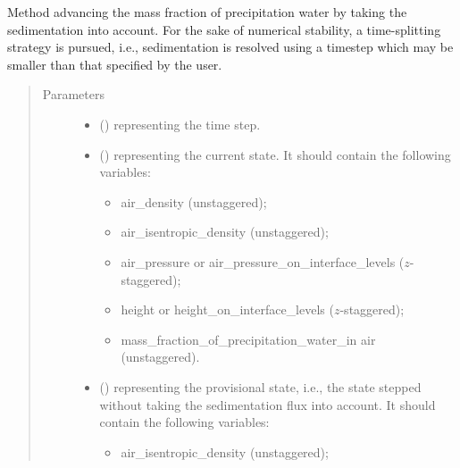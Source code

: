 \documentclass[letterpaper,10pt,english]{sphinxmanual}
\begin{document}
\begin{fulllineitems}
\begin{fulllineitems}
\label{\detokenize{api:dycore.prognostic_isentropic_forward_euler.PrognosticIsentropicForwardEuler.step_integrating_sedimentation_flux}}
Method advancing the mass fraction of precipitation water by taking the sedimentation into account.
For the sake of numerical stability, a time-splitting strategy is pursued, i.e., sedimentation is resolved
using a timestep which may be smaller than that specified by the user.
\begin{quote}\begin{description}
\item[{Parameters}] \leavevmode\begin{itemize}
\item {} 
 () \textendash{}  representing the time step.

\item {} 
 () \textendash{} 
 representing the current state.
It should contain the following variables:
\begin{itemize}
\item {} 
air\_density (unstaggered);

\item {} 
air\_isentropic\_density (unstaggered);

\item {} 
air\_pressure or air\_pressure\_on\_interface\_levels (\(z\)-staggered);

\item {} 
height or height\_on\_interface\_levels (\(z\)-staggered);

\item {} 
mass\_fraction\_of\_precipitation\_water\_in air (unstaggered).

\end{itemize}


\item {} 
 () \textendash{} 
 representing the provisional state, i.e.,
the state stepped without taking the sedimentation flux into account.
It should contain the following variables:
\begin{itemize}
\item {} 
air\_isentropic\_density (unstaggered);


\end{itemize}
\end{itemize}
\end{description}
\end{quote}
\end{fulllineitems}
\end{fulllineitems}
\end{document}
